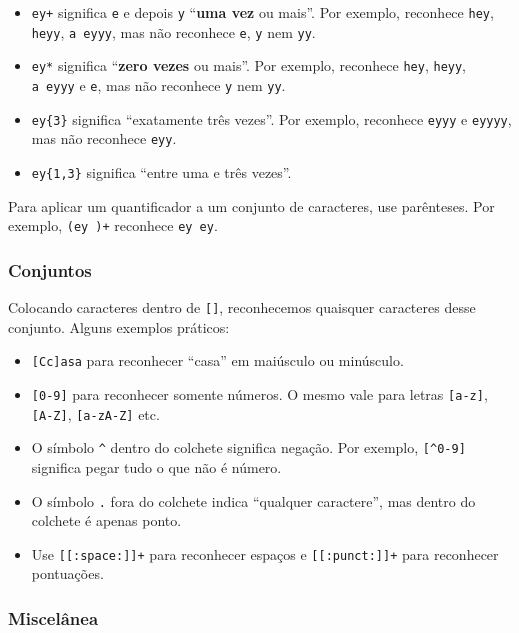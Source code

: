 \documentclass[]{book}
\providecommand{\tightlist}{%
  \setlength{\itemsep}{0pt}\setlength{\parskip}{0pt}}
\begin{document}
\begin{itemize}
\tightlist
\item
  \texttt{ey+} significa \texttt{e} e depois \texttt{y} ``\textbf{uma
  vez} ou mais''. Por exemplo, reconhece \texttt{hey}, \texttt{heyy},
  \texttt{a\ eyyy}, mas não reconhece \texttt{e}, \texttt{y} nem
  \texttt{yy}.
\item
  \texttt{ey*} significa ``\textbf{zero vezes} ou mais''. Por exemplo,
  reconhece \texttt{hey}, \texttt{heyy}, \texttt{a\ eyyy} e \texttt{e},
  mas não reconhece \texttt{y} nem \texttt{yy}.
\item
  \texttt{ey\{3\}} significa ``exatamente três vezes''. Por exemplo,
  reconhece \texttt{eyyy} e \texttt{eyyyy}, mas não reconhece
  \texttt{eyy}.
\item
  \texttt{ey\{1,3\}} significa ``entre uma e três vezes''.
\end{itemize}

Para aplicar um quantificador a um conjunto de caracteres, use
parênteses. Por exemplo, \texttt{(ey\ )+} reconhece \texttt{ey\ ey}.

\subsubsection{Conjuntos}\label{conjuntos}

Colocando caracteres dentro de \texttt{{[}{]}}, reconhecemos quaisquer
caracteres desse conjunto. Alguns exemplos práticos:

\begin{itemize}
\tightlist
\item
  \texttt{{[}Cc{]}asa} para reconhecer ``casa'' em maiúsculo ou
  minúsculo.
\item
  \texttt{{[}0-9{]}} para reconhecer somente números. O mesmo vale para
  letras \texttt{{[}a-z{]}}, \texttt{{[}A-Z{]}}, \texttt{{[}a-zA-Z{]}}
  etc.
\item
  O símbolo \texttt{\^{}} dentro do colchete significa negação. Por
  exemplo, \texttt{{[}\^{}0-9{]}} significa pegar tudo o que não é
  número.
\item
  O símbolo \texttt{.} fora do colchete indica ``qualquer caractere'',
  mas dentro do colchete é apenas ponto.
\item
  Use \texttt{{[}{[}:space:{]}{]}+} para reconhecer espaços e
  \texttt{{[}{[}:punct:{]}{]}+} para reconhecer pontuações.
\end{itemize}

\subsubsection{Miscelânea}\label{miscelanea}
\end{document}

